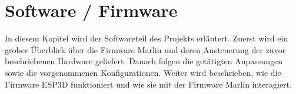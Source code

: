 \section{Software / Firmware}
\label{sec:Software/Firmware}

In diesem Kapitel wird der Softwareteil des Projekts erläutert. Zuerst wird ein grober Überblick über die Firmware Marlin und deren Ansteuerung der zuvor beschriebenen Hardware geliefert. Danach folgen die getätigten Anpassungen sowie die vorgenommenen Konfigurationen. Weiter wird beschrieben, wie die Firmware ESP3D funktioniert und wie sie mit der Firmware Marlin interagiert.
